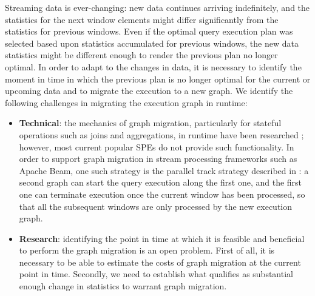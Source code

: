 Streaming data is ever-changing: new data continues arriving indefinitely, and the statistics for the next window elements might differ significantly from the statistics for previous windows. Even if the optimal query execution plan was selected based upon statistics accumulated for previous windows, the new data statistics might be different enough to render the previous plan no longer optimal. In order to adapt to the changes in data, it is necessary to identify the moment in time in which the previous plan is no longer optimal for the current or upcoming data and to migrate the execution to a new graph. %
We identify the following challenges in migrating the execution graph in runtime:
\begin{itemize}
    \item \textbf{Technical}: the mechanics of graph migration, particularly for stateful operations such as joins and aggregations, in runtime have been researched \cite{zhu2004dynamic}; %
    however, most current popular SPEs do not provide such functionality. In order to support graph migration in stream processing frameworks such as Apache Beam, one such strategy is the parallel track strategy described in \cite{zhu2004dynamic}: a second graph can start the query execution along the first one, and the first one can terminate execution once the current window has been processed, so that all the subsequent windows are only processed by the new execution graph.
    \item \textbf{Research}: identifying the point in time at which it is feasible and beneficial to perform the graph migration is an open problem. First of all, it is necessary to be able to estimate the costs of graph migration at the current point in time. Secondly, we need to establish what qualifies as substantial enough change in statistics to warrant graph migration. %
\end{itemize}